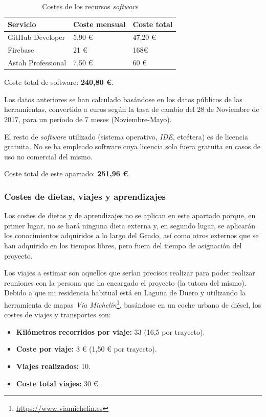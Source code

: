 \documentclass[twoside]{report}
\begin{document}
\begin{table}[H]
\centering
\begin{tabular}{|l|l|l|}
\hline
Servicio         & Coste mensual & Coste total \\ \hline
GitHub Developer & 5,90 \euro        & 47,20 \euro          \\ \hline
Firebase         & 21 \euro      & 168\euro           \\ \hline
Astah Professional & 7,50 \euro & 60 \euro \\ \hline
\end{tabular}
\caption{Costes de los recursos \textit{software}}
\end{table}

Coste total de software: \textbf{240,80 \euro}.

Los datos anteriores se han calculado basándose en los datos públicos de las herramientas, convertido a euros según la tasa de cambio del 28 de Noviembre de 2017, para un período de 7 meses (Noviembre-Mayo).

El resto de \textit{software} utilizado (sistema operativo, \textit{IDE}, etcétera) es de licencia gratuita. No se ha empleado software cuya licencia solo fuera gratuita en casos de uso no comercial del mismo.

Coste total de este apartado: \textbf{251,96 \euro}.

\subsubsection{Costes de dietas, viajes y aprendizajes}

Los costes de dietas y de aprendizajes no se aplican en este apartado porque, en primer lugar, no se hará ninguna dieta externa y, en segundo lugar, se aplicarán los conocimientos adquiridos a lo largo del Grado, así como otros externos que se han adquirido en los tiempos libres, pero fuera del tiempo de asignación del proyecto.

Los viajes a estimar son aquellos que serían precisos realizar para poder realizar reuniones con la persona que ha encargado el proyecto (la tutora del mismo). Debido a que mi residencia habitual está en Laguna de Duero y utilizando la herramienta de mapas \textit{Vía Michelín}\footnote{\url{https://www.viamichelin.es}}, basándose en un coche urbano de diésel, los costes de viajes y transportes son:

\begin{itemize}
\item \textbf{Kilómetros recorridos por viaje:} 33 (16,5 por trayecto).
\item \textbf{Coste por viaje:} 3 \euro \hspace{0.1cm} (1,50 \euro \hspace{0.1cm} por trayecto).
\item \textbf{Viajes realizados:} 10.
\item \textbf{Coste total viajes:} 30 \euro.
\end{itemize}
\end{document}
